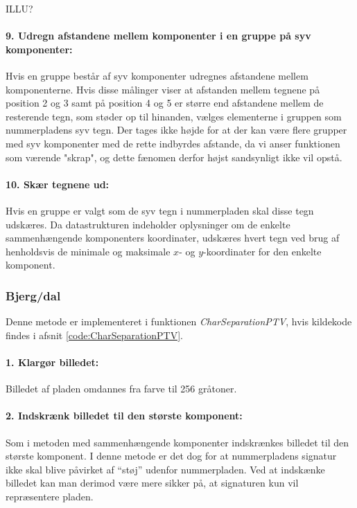 ILLU?

\paragraph{9. Udregn afstandene mellem komponenter i en gruppe på syv komponenter:} Hvis en gruppe består af syv komponenter udregnes afstandene mellem komponenterne. Hvis disse målinger viser at afstanden mellem tegnene på position 2 og 3 samt på position 4 og 5 er større end afstandene mellem de resterende tegn, som støder op til hinanden, vælges elementerne i gruppen som nummerpladens syv tegn. Der tages ikke højde for at der kan være flere grupper med syv komponenter med de rette indbyrdes afstande, da vi anser funktionen som værende "skrap", og dette fænomen derfor højst sandsynligt ikke vil opstå.

\paragraph{10. Skær tegnene ud:} Hvis en gruppe er valgt som de syv tegn i nummerpladen skal disse tegn udskæres. Da datastrukturen indeholder oplysninger om de enkelte sammenhængende komponenters koordinater, udskæres hvert tegn ved brug af henholdsvis de minimale og maksimale $x$- og $y$-koordinater for den enkelte komponent.

\subsubsection*{Bjerg/dal}
Denne metode er implementeret i funktionen \textit{CharSeparationPTV}, hvis kildekode findes i afsnit \vref{code:CharSeparationPTV}.

\paragraph{1. Klargør billedet:} Billedet af pladen omdannes fra farve til 256 gråtoner.

\paragraph{2. Indskrænk billedet til den største komponent:} Som i metoden med sammenhængende komponenter indskrænkes billedet til den største komponent. I denne metode er det dog for at nummerpladens signatur ikke skal blive påvirket af ``støj'' udenfor nummerpladen. Ved at indskænke billedet kan man derimod være mere sikker på, at signaturen kun vil repræsentere pladen.

